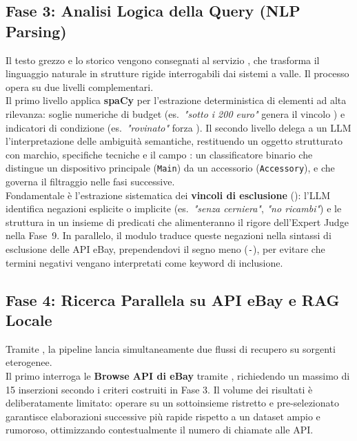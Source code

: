 \subsection*{Fase 3: Analisi Logica della Query (NLP Parsing)}
Il testo grezzo e lo storico vengono consegnati al servizio
, che trasforma il linguaggio naturale in
strutture rigide interrogabili dai sistemi a valle. Il processo opera su
due livelli complementari.\\

\noindent
Il primo livello applica \textbf{spaCy} per l'estrazione deterministica di
elementi ad alta rilevanza: soglie numeriche di budget (es.\ \emph{"sotto i
200 euro"} genera il vincolo ) e indicatori di
condizione (es.\ \emph{"rovinato"} forza ).
Il secondo livello delega a un LLM l'interpretazione delle ambiguità
semantiche, restituendo un oggetto strutturato con marchio, specifiche
tecniche e il campo : un classificatore binario
che distingue un dispositivo principale (\texttt{Main}) da un accessorio
(\texttt{Accessory}), e che governa il filtraggio nelle fasi successive.\\

\noindent
Fondamentale è l'estrazione sistematica dei \textbf{vincoli di esclusione}
(): l'LLM identifica negazioni esplicite o implicite
(es.\ \emph{"senza cerniera"}, \emph{"no ricambi"}) e le struttura in un
insieme di predicati che alimenteranno il rigore dell'Expert Judge nella
Fase~9. In parallelo, il modulo  traduce queste
negazioni nella sintassi di esclusione delle API eBay, prependendovi il
segno meno (\texttt{-}), per evitare che termini negativi vengano
interpretati come keyword di inclusione.

\subsection*{Fase 4: Ricerca Parallela su API eBay e RAG Locale}
Tramite , la pipeline lancia simultaneamente due flussi
di recupero su sorgenti eterogenee.\\

\noindent
Il primo interroga le \textbf{Browse API di eBay} tramite ,
richiedendo un massimo di 15 inserzioni secondo i criteri costruiti in
Fase 3. Il volume dei risultati è deliberatamente limitato: operare su un sottoinsieme ristretto e pre-selezionato garantisce elaborazioni successive più rapide rispetto a un dataset ampio e rumoroso, ottimizzando contestualmente il numero di chiamate alle API.\\

